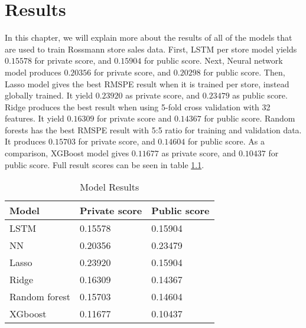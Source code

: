 \chapter{Results}
In this chapter, we will explain more about the results of all of the models that are used to train Rossmann store sales data. 
First, LSTM per store model yields $0.15578$ for private score, and $0.15904$ for public score. Next, Neural network model produces $0.20356$ for private score, and $0.20298$ for public score. Then, Lasso model gives the best RMSPE result when it is trained per store, instead globally trained. It yield $0.23920$ as private score, and $0.23479$ as public score. Ridge produces the best result when using 5-fold cross validation with 32 features. It yield $0.16309$ for private score and $0.14367$ for public score. Random forests has the best RMSPE result with 5:5 ratio for training and validation data. It produces $0.15703$ for private score, and $0.14604$ for public score. As a comparison, XGBoost model gives $0.11677$ as private score, and $0.10437$ for public score. Full result scores can be seen in table \ref{tab:result}.
\begin{table}[H]
	\centering
	\caption{Model Results}
	\label{tab:result}
	\begin{tabular}{|m{200pt}|m{100pt}|m{100pt}|}
		\hline
		Model & Private score & Public score \\ \hline
		LSTM & 0.15578 & 0.15904 \\ \hline
		NN & 0.20356 & 0.23479 \\ \hline
		Lasso & 0.23920 & 0.15904 \\ \hline
		Ridge & 0.16309 & 0.14367 \\ \hline
		Random forest & 0.15703 & 0.14604 \\ \hline
		XGboost & 0.11677 & 0.10437 \\ \hline
	\end{tabular}
\end{table}